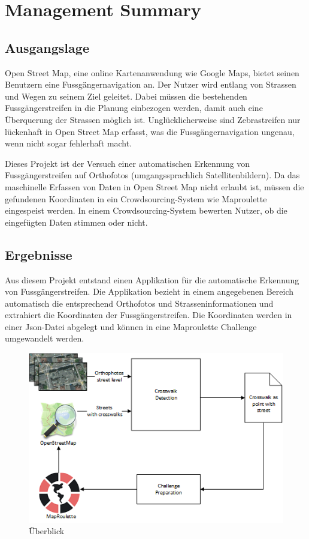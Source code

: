 \section{Management Summary}
\subsection*{Ausgangslage}
Open Street Map, eine online Kartenanwendung wie Google Maps, bietet seinen Benutzern eine Fussgängernavigation an. Der Nutzer wird entlang von Strassen und Wegen zu seinem Ziel geleitet. Dabei müssen die bestehenden Fussgängerstreifen in die Planung einbezogen werden, damit auch eine Überquerung der Strassen möglich ist. Unglücklicherweise sind Zebrastreifen nur lückenhaft in Open Street Map erfasst, was die Fussgängernavigation ungenau, wenn nicht sogar fehlerhaft macht.

Dieses Projekt ist der Versuch einer automatischen Erkennung von Fussgängerstreifen auf Orthofotos (umgangssprachlich Satellitenbildern). Da das maschinelle Erfassen von Daten in Open Street Map nicht erlaubt ist, müssen die gefundenen Koordinaten in ein Crowdsourcing-System wie Maproulette eingespeist werden. In einem Crowdsourcing-System bewerten Nutzer, ob die eingefügten Daten stimmen oder nicht.

\subsection*{Ergebnisse}
Aus diesem Projekt entstand einen Applikation für die automatische Erkennung von Fussgängerstreifen. Die Applikation bezieht in einem angegebenen Bereich automatisch die entsprechend Orthofotos und Strasseninformationen und extrahiert die Koordinaten der Fussgängerstreifen. Die Koordinaten werden in einer Json-Datei abgelegt und können in eine Maproulette Challenge umgewandelt werden. 
\\
\begin{figure}[H]
	\centering
	\includegraphics[]{images/management_summary_1.png}
	\caption[Management Summery Überblick]{Überblick}
\end{figure}

